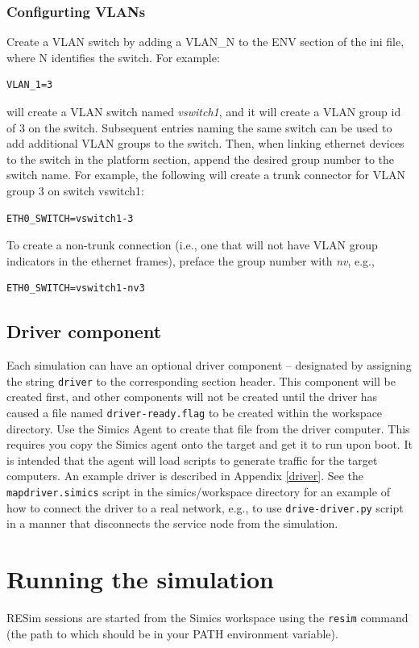 \documentclass[titlepage]{article}
\begin{document}
\subsubsection{Configurting VLANs}
Create a VLAN switch by adding a {VLAN\_N} to the ENV section of the ini file, where N identifies the switch.  For example:
\begin{verbatim}
VLAN_1=3
\end{verbatim}
\noindent will create a VLAN switch named \textit{vswitch1}, and it will create a VLAN group id of 3 on the switch.  Subsequent entries naming the same switch
can be used to add additional VLAN groups to the switch.  Then, when linking ethernet devices to the switch in the platform section, append the desired group 
number to the switch name.  For example, the following will create a trunk connector for VLAN group 3 on switch vswitch1:
\begin{verbatim}
ETH0_SWITCH=vswitch1-3
\end{verbatim}
\noindent To create a non-trunk connection (i.e., one that will not have VLAN group indicators in the ethernet frames), preface the group number with 
\textit{nv}, e.g.,
\begin{verbatim}
ETH0_SWITCH=vswitch1-nv3
\end{verbatim}

\subsection{Driver component}
Each simulation can have an optional driver component -- designated by assigning the string {\tt driver} to the corresponding
section header.  This component will be created first, and other components will not be created until the driver has
caused a file named {\tt driver-ready.flag} to be created within the workspace directory.  Use the Simics Agent to 
create that file from the driver computer.  This requires you copy the Simics agent onto the target and get it to run
upon boot.  It is intended that the agent will load scripts to generate traffic for the target computers.  
An example driver is described in Appendix \ref{driver}.   
See the {\tt mapdriver.simics} script in the simics/workspace directory for an example of how to connect the driver to a real network,
e.g., to use {\tt drive-driver.py} script in a manner that disconnects the service node from the simulation.

\section{Running the simulation}
\label{running}
RESim sessions are started from the Simics workspace using the {\tt resim} command (the path to which should be in your PATH
environment variable).
\end{document}

